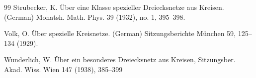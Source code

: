 \documentclass[11pt,a4paper]{article}
\begin{document}
\begin{thebibliography}{99}
 Strubecker, K. 
Über eine Klasse spezieller Dreiecksnetze aus Kreisen. (German) 
Monatsh. Math. Phys. 39 (1932), no. 1, 395--398. 

 Volk, O.
Über spezielle Kreisnetze. (German) 
Sitzungsberichte München 59, 125--134 (1929).

 Wunderlich, W. \"Uber ein besonderes Dreiecksnetz aus Kreisen, Sitzungsber. Akad. Wiss. Wien 147 (1938), 385--399 


\end{thebibliography}
\end{document}
